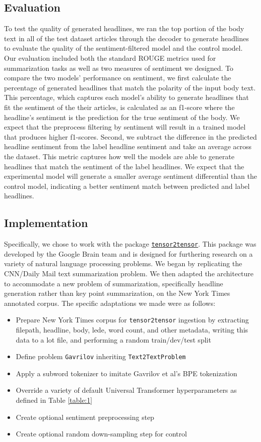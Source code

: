\documentclass[11pt]{article}
\begin{document}
\subsection{Evaluation}
To test the quality of generated headlines, we ran the top portion of the body text in all of the test dataset articles through the decoder to generate headlines to evaluate the quality of the sentiment-filtered model and the control model. Our evaluation included both the standard ROUGE metrics used for summarization tasks as well as two measures of sentiment we designed. 
To compare the two models' performance on sentiment, we first calculate the percentage of generated headlines that match the polarity of the input body text. This percentage, which captures each model's ability to generate headlines that fit the sentiment of the their articles, is calculated as an f1-score where the headline's sentiment is the prediction for the true sentiment of the body. We expect that the preprocess filtering by sentiment will result in a trained model that produces higher f1-scores. Second, we subtract the difference in the predicted headline sentiment from the label headline sentiment and take an average across the dataset. This metric captures how well the models are able to generate headlines that match the sentiment of the label headlines. We expect that the experimental model will generate a smaller average sentiment differential than the control model, indicating a better sentiment match between predicted and label headlines.  
\subsection{Implementation}
Specifically, we chose to work with the package \href{https://github.com/tensorflow/tensor2tensor}{\texttt{tensor2tensor}}. This package was developed by the Google Brain team and is designed for furthering research on a variety of natural language processing problems\cite{vaswani-etal-2018-tensor2tensor}. We began by replicating the CNN/Daily Mail text summarization problem. We then adapted the architecture to accommodate a new problem of summarization, specifically headline generation rather than key point summarization, on the New York Times annotated corpus. The specific adaptations we made were as follows:

\begin{itemize}
    \item Prepare New York Times corpus for \texttt{tensor2tensor} ingestion by extracting filepath, headline, body, lede, word count, and other metadata, writing this data to a lot file, and performing a random train/dev/test split
    \item Define problem \texttt{Gavrilov} inheriting \texttt{Text2TextProblem}
    \item Apply a subword tokenizer to imitate Gavrilov et al's BPE tokenization
    \item Override a variety of default Universal Transformer hyperparameters as defined in Table \ref{table:1}
    \item Create optional sentiment preprocessing step
    \item Create optional random down-sampling step for control
\end{itemize}
\end{document}
